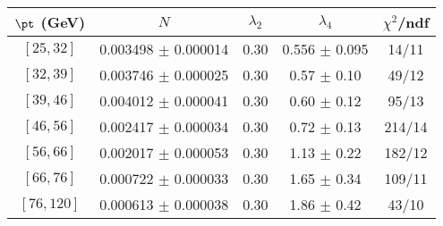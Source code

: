 \begin{tabular}{c||c|c|c|c}
$\pt$ (GeV) & $N$ & $\lambda_{2}$ & $\lambda_4$  & $\chi^2$/ndf  \\
\hline
$[25, 32]$ & 0.003498 $\pm$ 0.000014 & 0.30 & 0.556 $\pm$ 0.095 & 14/11\\
$[32, 39]$ & 0.003746 $\pm$ 0.000025 & 0.30 & 0.57 $\pm$ 0.10 & 49/12\\
$[39, 46]$ & 0.004012 $\pm$ 0.000041 & 0.30 & 0.60 $\pm$ 0.12 & 95/13\\
$[46, 56]$ & 0.002417 $\pm$ 0.000034 & 0.30 & 0.72 $\pm$ 0.13 & 214/14\\
$[56, 66]$ & 0.002017 $\pm$ 0.000053 & 0.30 & 1.13 $\pm$ 0.22 & 182/12\\
$[66, 76]$ & 0.000722 $\pm$ 0.000033 & 0.30 & 1.65 $\pm$ 0.34 & 109/11\\
$[76, 120]$ & 0.000613 $\pm$ 0.000038 & 0.30 & 1.86 $\pm$ 0.42 & 43/10\\
\end{tabular}
